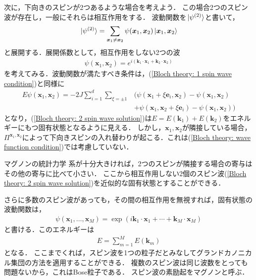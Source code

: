 \documentclass[../main.tex]{subfiles}
\begin{document}
\begin{frame}
    次に，下向きのスピンが2つあるような場合を考えよう．
    この場合2つのスピン波が存在し，一般にそれらは相互作用をする．
    波動関数を$\ket*{\psi^{(2)}}$と書いて，
    \begin{align}
        \ket*{\psi^{(2)}} = \sum_{\bm{x}_1 \ne \bm{x}_2} \psi(\bm{x}_1, \bm{x}_2) \ket{\bm{x}_1, \bm{x}_2}
    \end{align}
    と展開する．展開係数として，相互作用をしない2つの波
    \begin{align}
        \psi(\bm{x}_1, \bm{x}_2) = e^{i(\bm{k}_1\cdot \bm{x}_1 + \bm{k}_2 \cdot \bm{x}_2)} 
        \label{Bloch theory: 2 spin wave solution}
    \end{align}
    を考えてみる．波動関数が満たすべき条件は，(\ref{Bloch theory: 1 spin wave condition})と同様に
    \begin{align}
        \nonumber
        E\psi(\bm{x}_1, \bm{x}_2)
        = -2J \sum_{i=1}^d \sum_{\xi=\pm 1} &(\psi(\bm{x}_1 + \xi\bm{e}_i, \bm{x}_2) - \psi(\bm{x}_1, \bm{x}_2)
        \\ &
       +\psi(\bm{x}_1, \bm{x}_2 + \xi \bm{e}_i) - \psi(\bm{x}_1, \bm{x}_2))
       \label{Bloch theory: wave function condition}
    \end{align}
    となり，(\ref{Bloch theory: 2 spin wave solution})は$E = E(\bm{k}_1) + E(\bm{k}_2)$をエネルギーにもつ固有状態となるように見える．
    しかし，$\bm{x}_1,\bm{x}_2$が隣接している場合，$\Pi^{\bm{x}_1,\bm{x}_2}$によって下向きスピンの入れ替わりが起こる．これは(\ref{Bloch theory: wave function condition})では考慮していない．
\end{frame}

\begin{frame}{マグノンの統計力学}
    系が十分大きければ，2つのスピンが隣接する場合の寄与はその他の寄与に比べて小さい．
    ここから相互作用しない2個のスピン波(\ref{Bloch theory: 2 spin wave solution})を近似的な固有状態とすることができる．

    さらに多数のスピン波があっても，その間の相互作用を無視すれば，固有状態の波動関数は，
    \begin{align}
        \psi(\bm{x}_1, \ldots, \bm{x}_M) = \exp(i \bm{k}_1 \cdot \bm{x}_1 + \cdots + \bm{k}_M \cdot \bm{x}_M)
    \end{align}
    と書ける．このエネルギーは
    \begin{align}
        E = \sum_{m=1}^M E(\bm{k}_m)
    \end{align}
    となる．
    ここまでくれば，スピン波を1つの粒子だとみなしてグランドカノニカル集団の方法を適用することができる．
    複数のスピン波は同じ波数をとっても問題ないから，これはBose粒子である．
    スピン波の素励起を\alert{マグノン}と呼ぶ．
\end{frame}
\end{document}
